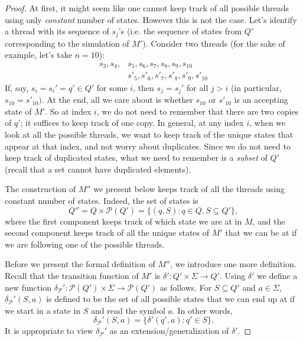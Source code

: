 \begin{flex}
\begin{proof}
At first, it might seem like one cannot keep track of all possible threads using only \emph{constant} number of states. 
However this is not the case. 
Let's identify a thread with its sequence of $s_j$'s (i.e. the sequence of states from $Q'$ corresponding to the simulation of $M'$). 
Consider two threads (for the sake of example, let's take $n = 10$):
\[ \begin{align*}
s_3, s_4, & s_5, s_6, s_7, s_8, s_9, s_{10} \\
& s'_5, s'_6, s'_7, s'_8, s'_9, s'_{10}
\end{align*} \]
If, say, $s_i = s_i' = q' \in Q'$ for some $i$, then $s_j = s_j'$ for all $j > i$ (in particular, $s_{10} = s'_{10})$. 
At the end, all we care about is whether $s_{10}$ or $s'_{10}$ is an accepting state of $M'$. 
So at index $i$, we do not need to remember that there are two copies of $q'$; it suffices to keep track of one copy. 
In general, at any index $i$, when we look at all the possible threads, we want to keep track of the unique states that appear at that index, and not worry about duplicates. 
Since we do not need to keep track of duplicated states, what we need to remember is a \emph{subset} of $Q'$ (recall that a set cannot have duplicated elements).

The construction of $M''$ we present below keeps track of all the threads using constant number of states. 
Indeed, the set of states is 
\[
    Q'' = Q \times \mathcal{P}(Q') = \{(q, S): q \in Q, S \subseteq Q'\}, 
\]
where the first component keeps track of which state we are at in $M$, and the second component keeps track of all the unique states of $M'$ that we can be at if we are following one of the possible threads.

Before we present the formal definition of $M''$, we introduce one more definition. 
Recall that the transition function of $M'$ is $\delta' : Q' \times \Sigma \to Q'$. 
Using $\delta'$ we define a new function $\delta_{\mathcal{P}}' : \mathcal{P}(Q') \times \Sigma \to \mathcal{P}(Q')$ as follows. 
For $S \subseteq Q'$ and $a \in \Sigma$, $\delta_{\mathcal{P}}'(S, a)$ is defined to be the set of all possible states that we can end up at if we start in a state in $S$ and read the symbol $a$. 
In other words,
\[
   \delta_{\mathcal{P}}'(S, a) = \{\delta'(q', a) : q' \in S\}.
\]
It is appropriate to view $\delta_{\mathcal{P}}'$ as an extension/generalization of $\delta'$.


\end{proof}
\end{flex}
